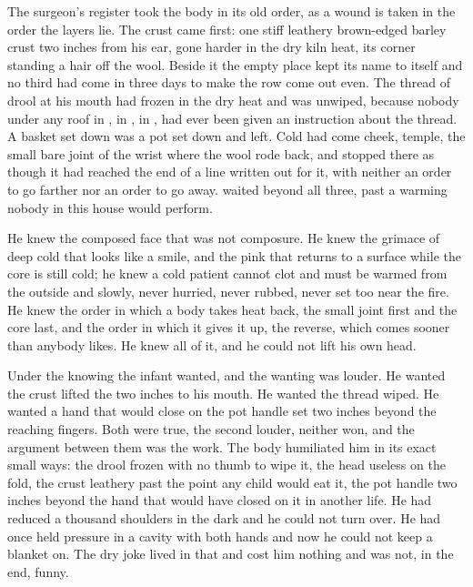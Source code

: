 The surgeon's register took the body in its old order, as a wound is taken in the order the layers lie. The crust came first: one stiff leathery brown-edged barley crust two inches from his ear, gone harder in the dry kiln heat, its corner standing a hair off the wool. Beside it the empty place kept its name to itself and no third had come in three days to make the row come out even. The thread of drool at his mouth had frozen in the dry heat and was unwiped, because nobody under any roof in , in , in , had ever been given an instruction about the thread. A basket set down was a pot set down and left. Cold had come cheek, temple, the small bare joint of the wrist where the wool rode back, and stopped there as though it had reached the end of a line written out for it, with neither an order to go farther nor an order to go away.  waited beyond all three, past a warming nobody in this house would perform.

He knew the composed face that was not composure. He knew the grimace of deep cold that looks like a smile, and the pink that returns to a surface while the core is still cold; he knew a cold patient cannot clot and must be warmed from the outside and slowly, never hurried, never rubbed, never set too near the fire. He knew the order in which a body takes heat back, the small joint first and the core last, and the order in which it gives it up, the reverse, which comes sooner than anybody likes. He knew all of it, and he could not lift his own head.

Under the knowing the infant wanted, and the wanting was louder. He wanted the crust lifted the two inches to his mouth. He wanted the thread wiped. He wanted a hand that would close on the pot handle set two inches beyond the reaching fingers. Both were true, the second louder, neither won, and the argument between them was the work. The body humiliated him in its exact small ways: the drool frozen with no thumb to wipe it, the head useless on the fold, the crust leathery past the point any child would eat it, the pot handle two inches beyond the hand that would have closed on it in another life. He had reduced a thousand shoulders in the dark and he could not turn over. He had once held pressure in a cavity with both hands and now he could not keep a blanket on. The dry joke lived in that and cost him nothing and was not, in the end, funny.

\scenebreak


